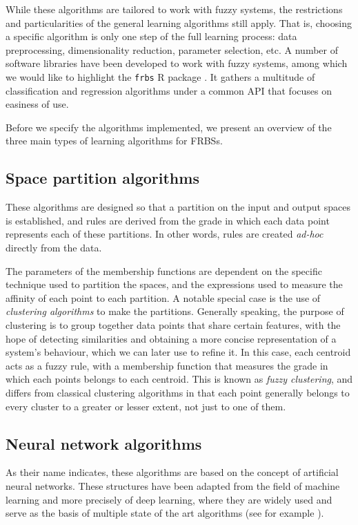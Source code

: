 While these algorithms are tailored to work with fuzzy systems, the restrictions and particularities of the general learning algorithms still apply. That is, choosing a specific algorithm is only one step of the full learning process: data preprocessing, dimensionality reduction, parameter selection, etc. A number of software libraries have been developed to work with fuzzy systems, among which we would like to highlight the \verb|frbs| R package \cite{riza2015frbs}. It gathers a multitude of classification and regression algorithms under a common API that focuses on easiness of use.

Before we specify the algorithms implemented, we present an overview of the three main types of learning algorithms for FRBSs.

\subsection{Space partition algorithms}

These algorithms are designed so that a partition on the input and output spaces is established, and rules are derived from the grade in which each data point represents each of these partitions. In other words, rules are created \textit{ad-hoc} directly from the data.

The parameters of the membership functions are dependent on the specific technique used to partition the spaces, and the expressions used to measure the affinity of each point to each partition. A notable special case is the use of \textit{clustering algorithms} to make the partitions. Generally speaking, the purpose of clustering is to group together data points that share certain features, with the hope of detecting similarities and obtaining a more concise representation of a system's behaviour, which we can later use to refine it. In this case, each centroid acts as a fuzzy rule, with a membership function that measures the grade in which each points belongs to each centroid. This is known as \textit{fuzzy clustering}, and differs from classical clustering algorithms in that each point generally belongs to every cluster to a greater or lesser extent, not just to one of them.

\subsection{Neural network algorithms}

As their name indicates, these algorithms are based on the concept of artificial neural networks. These structures have been adapted from the field of machine learning and more precisely of deep learning, where they are widely used and serve as the basis of multiple state of the art algorithms (see for example \cite{lecun2015deep}).

